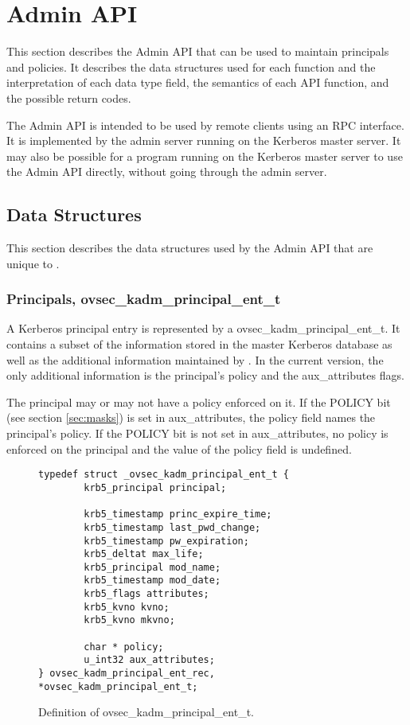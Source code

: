 \section{Admin API}

This section describes the Admin API that can be used to maintain
principals and policies.  It describes the data structures used for
each function and the interpretation of each data type field, the
semantics of each API function, and the possible return codes.

The Admin API is intended to be used by remote clients using an RPC
interface.  It is implemented by the admin server running on the
Kerberos master server.  It may also be possible for a program running
on the Kerberos master server to use the Admin API directly, without
going through the admin server.

\subsection{Data Structures}

This section describes the data structures used by the Admin API that
are unique to \secure{}.

\subsubsection{Principals, ovsec_kadm_principal_ent_t}
\label{sec:principal-structure}

A Kerberos principal entry is represented by a
ovsec_kadm_principal_ent_t.  It contains a subset of the information
stored in the master Kerberos database as well as the additional
information maintained by \secure{}.  In the current version, the only
additional information is the principal's policy and the
aux_attributes flags.

The principal may or may not have a policy enforced on it.  If the
POLICY bit (see section \ref{sec:masks}) is set in aux_attributes, the
policy field names the principal's policy.  If the POLICY bit is not
set in aux_attributes, no policy is enforced on the principal and the
value of the policy field is undefined.

\begin{figure}[htbp]
\begin{verbatim}
typedef struct _ovsec_kadm_principal_ent_t {
        krb5_principal principal;

        krb5_timestamp princ_expire_time;
        krb5_timestamp last_pwd_change;
        krb5_timestamp pw_expiration;
        krb5_deltat max_life;
        krb5_principal mod_name;
        krb5_timestamp mod_date;
        krb5_flags attributes;
        krb5_kvno kvno;
        krb5_kvno mkvno;

        char * policy;
        u_int32 aux_attributes;
} ovsec_kadm_principal_ent_rec, *ovsec_kadm_principal_ent_t;
\end{verbatim}
\caption{Definition of ovsec_kadm_principal_ent_t.}
\label{fig:princ-t}
\end{figure}

